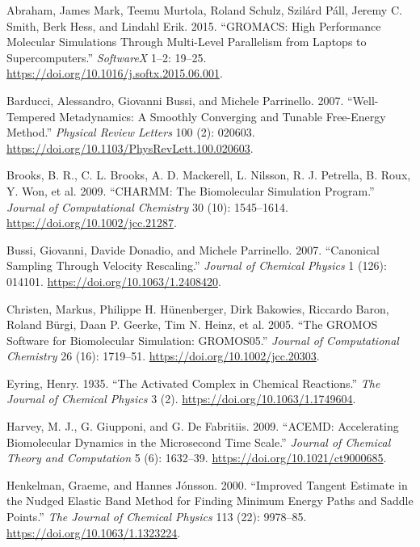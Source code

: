 \hypertarget{refs}{}
\begin{CSLReferences}{1}{0}
\leavevmode{}%
Abraham, James Mark, Teemu Murtola, Roland Schulz, Szilárd Páll, Jeremy C. Smith, Berk Hess, and Lindahl Erik. 2015. {``GROMACS: High Performance Molecular Simulations Through Multi-Level Parallelism from Laptops to Supercomputers.''} \emph{SoftwareX} 1--2: 19--25. \url{https://doi.org/10.1016/j.softx.2015.06.001}.

\leavevmode{}%
Barducci, Alessandro, Giovanni Bussi, and Michele Parrinello. 2007. {``Well-Tempered Metadynamics: A Smoothly Converging and Tunable Free-Energy Method.''} \emph{Physical Review Letters} 100 (2): 020603. \url{https://doi.org/10.1103/PhysRevLett.100.020603}.

\leavevmode{}%
Brooks, B. R., C. L. Brooks, A. D. Mackerell, L. Nilsson, R. J. Petrella, B. Roux, Y. Won, et al. 2009. {``CHARMM: The Biomolecular Simulation Program.''} \emph{Journal of Computational Chemistry} 30 (10): 1545--1614. \url{https://doi.org/10.1002/jcc.21287}.

\leavevmode{}%
Bussi, Giovanni, Davide Donadio, and Michele Parrinello. 2007. {``Canonical Sampling Through Velocity Rescaling.''} \emph{Journal of Chemical Physics} 1 (126): 014101. \url{https://doi.org/10.1063/1.2408420}.

\leavevmode{}%
Christen, Markus, Philippe H. Hünenberger, Dirk Bakowies, Riccardo Baron, Roland Bürgi, Daan P. Geerke, Tim N. Heinz, et al. 2005. {``The GROMOS Software for Biomolecular Simulation: GROMOS05.''} \emph{Journal of Computational Chemistry} 26 (16): 1719--51. \url{https://doi.org/10.1002/jcc.20303}.

\leavevmode{}%
Eyring, Henry. 1935. {``The Activated Complex in Chemical Reactions.''} \emph{The Journal of Chemical Physics} 3 (2). \url{https://doi.org/10.1063/1.1749604}.

\leavevmode{}%
Harvey, M. J., G. Giupponi, and G. De Fabritiis. 2009. {``ACEMD: Accelerating Biomolecular Dynamics in the Microsecond Time Scale.''} \emph{Journal of Chemical Theory and Computation} 5 (6): 1632--39. \url{https://doi.org/10.1021/ct9000685}.

\leavevmode{}%
Henkelman, Graeme, and Hannes Jónsson. 2000. {``Improved Tangent Estimate in the Nudged Elastic Band Method for Finding Minimum Energy Paths and Saddle Points.''} \emph{The Journal of Chemical Physics} 113 (22): 9978--85. \url{https://doi.org/10.1063/1.1323224}.


\end{CSLReferences}
